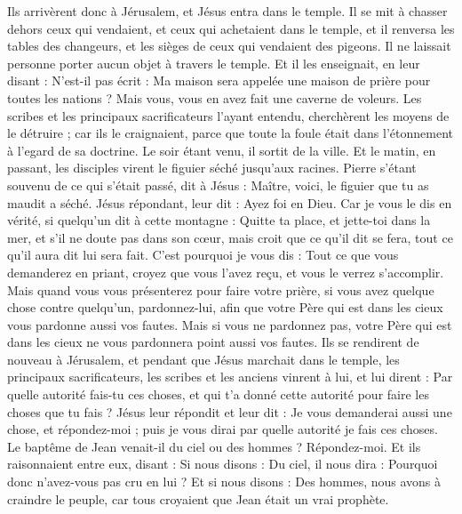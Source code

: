 \begin{multicols}{2}
Ils arrivèrent donc à Jérusalem, et Jésus entra dans le temple. Il se mit à chasser dehors ceux qui vendaient, et ceux qui achetaient dans le temple, et il renversa les tables des changeurs, et les sièges de ceux qui vendaient des pigeons.
Il ne laissait personne porter aucun objet à travers le temple.
Et il les enseignait, en leur disant : N'est-il pas écrit : Ma maison sera appelée une maison de prière pour toutes les nations ? Mais vous, vous en avez fait une caverne de voleurs.
Les scribes et les principaux sacrificateurs l'ayant entendu, cherchèrent les moyens de le détruire ; car ils le craignaient, parce que toute la foule était dans l'étonnement à l'egard de sa doctrine.
Le soir étant venu, il sortit de la ville.
Et le matin, en passant, les disciples virent le figuier séché jusqu'aux racines.
Pierre s'étant souvenu de ce qui s'était passé, dit à Jésus : Maître, voici, le figuier que tu as maudit a séché.
Jésus répondant, leur dit : Ayez foi en Dieu.
Car je vous le dis en vérité, si quelqu'un dit à cette montagne : Quitte ta place, et jette-toi dans la mer, et s'il ne doute pas dans son cœur, mais croit que ce qu'il dit se fera, tout ce qu'il aura dit lui sera fait.
C'est pourquoi je vous dis : Tout ce que vous demanderez en priant, croyez que vous l'avez reçu, et vous le verrez s'accomplir.
Mais quand vous vous présenterez pour faire votre prière, si vous avez quelque chose contre quelqu'un, pardonnez-lui, afin que votre Père qui est dans les cieux vous pardonne aussi vos fautes.
Mais si vous ne pardonnez pas, votre Père qui est dans les cieux ne vous pardonnera point aussi vos fautes.
Ils se rendirent de nouveau à Jérusalem, et pendant que Jésus marchait dans le temple, les principaux sacrificateurs, les scribes et les anciens vinrent à lui,
et lui dirent : Par quelle autorité fais-tu ces choses, et qui t'a donné cette autorité pour faire les choses que tu fais ?
Jésus leur répondit et leur dit : Je vous demanderai aussi une chose, et répondez-moi ; puis je vous dirai par quelle autorité je fais ces choses.
Le baptême de Jean venait-il du ciel ou des hommes ? Répondez-moi.
Et ils raisonnaient entre eux, disant : Si nous disons : Du ciel, il nous dira : Pourquoi donc n'avez-vous pas cru en lui ?
Et si nous disons : Des hommes, nous avons à craindre le peuple, car tous croyaient que Jean était un vrai prophète.

\end{multicols}
